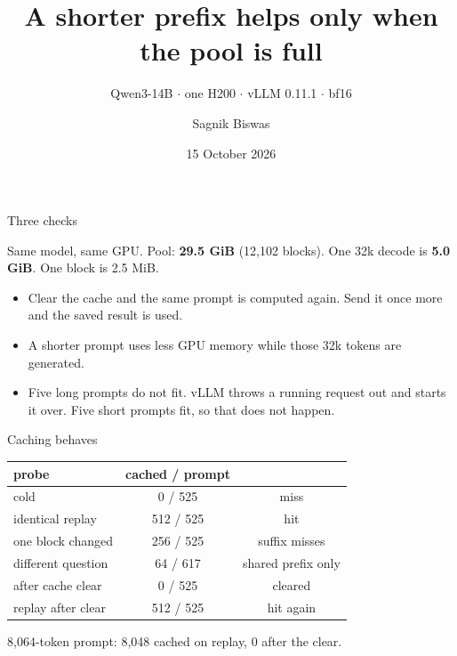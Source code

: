 \documentclass[aspectratio=169]{beamer}
\title{A shorter prefix helps only when the pool is full}
\subtitle{Qwen3-14B $\cdot$ one H200 $\cdot$ vLLM 0.11.1 $\cdot$ bf16}
\author{Sagnik Biswas}
\date{15 October 2026}
\begin{document}
\begin{frame}
\titlepage
\end{frame}

\begin{frame}{Three checks}

Same model, same GPU. Pool: \textbf{29.5 GiB} (12{,}102 blocks).
One 32k decode is \textbf{5.0 GiB}. One block is 2.5 MiB.

\begin{itemize}
  \item Clear the cache and the same prompt is computed again. Send it once more and the saved result is used.
  \item A shorter prompt uses less GPU memory while those 32k tokens are generated.
  \item Five long prompts do not fit. vLLM throws a running request out and starts it over. Five short prompts fit, so that does not happen.
\end{itemize}

\end{frame}

\begin{frame}{Caching behaves}

\begin{center}
\begin{tabular}{lcc}
\toprule
probe & cached / prompt & \\
\midrule
cold & 0 / 525 & miss \\
identical replay & 512 / 525 & hit \\
one block changed & 256 / 525 & suffix misses \\
different question & 64 / 617 & shared prefix only \\
after cache clear & 0 / 525 & cleared \\
replay after clear & 512 / 525 & hit again \\
\bottomrule
\end{tabular}
\end{center}

8{,}064-token prompt: 8{,}048 cached on replay, 0 after the clear.

\end{frame}
\end{document}
